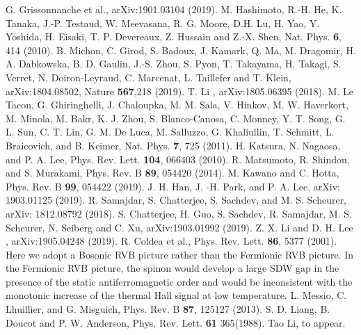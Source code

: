 \documentclass[prb,twocolumn,showpacs]{revtex4}
\begin{document}
\begin{thebibliography}{99}
 G. Grissonnanche et al., arXiv:1901.03104 (2019).
M. Hashimoto, R.-H. He, K. Tanaka, J.-P. Testaud, W. Meevasana, R. G. Moore, D.H. Lu, H. Yao, Y. Yoshida, H. Eisaki, T. P. Devereaux, Z. Hussain and Z.-X. Shen, Nat. Phys. \textbf{6}, 414 (2010).
B. Michon, C. Girod, S. Badoux, J. Kamark, Q. Ma, M. Dragomir, H. A. Dabkowska, B. D. Gaulin, J.-S. Zhou, S. Pyon, T. Takayama, H. Takagi, S. Verret, N.
Doiron-Leyraud, C. Marcenat, L. Taillefer and T. Klein, arXiv:1804.08502, Nature \textbf{567},218 (2019).
T. Li , arXiv:1805.06395 (2018).
M. Le Tacon, G. Ghiringhelli, J. Chaloupka, M. M. Sala, V. Hinkov, M. W. Haverkort, M. Minola, M. Bakr, K. J. Zhou, S. Blanco-Canosa, C. Monney, Y. T. Song, G. L. Sun, C. T. Lin, G. M. De Luca, M. Salluzzo, G. Khaliullin, T. Schmitt, L. Braicovich, and B. Keimer, Nat. Phys. \textbf{7}, 725 (2011).
H. Katsura, N. Nagaosa, and P. A. Lee,  Phys. Rev. Lett. \textbf{104}, 066403 (2010).
R. Matsumoto, R. Shindou, and S. Murakami, Phys. Rev. B \textbf{89}, 054420 (2014).
M. Kawano and C. Hotta, Phys. Rev. B \textbf{99}, 054422 (2019).
 J. H. Han, J. -H. Park, and P. A. Lee, arXiv: 1903.01125 (2019).
R. Samajdar, S. Chatterjee, S. Sachdev, and M. S. Scheurer, arXiv: 1812.08792 (2018).
 S. Chatterjee, H. Guo, S. Sachdev, R. Samajdar, M. S. Scheurer, N. Seiberg and C. Xu, arXiv:1903.01992 (2019).
 Z. X. Li and D. H. Lee , arXiv:1905.04248 (2019).
R. Coldea et al., Phys. Rev. Lett. \textbf{86}, 5377 (2001).
Here we adopt a Bosonic RVB picture rather than the Fermionic RVB picture. In the Fermionic RVB picture, the spinon would develop a large SDW gap in the presence of the static antiferromagnetic order and would be inconsistent with the monotonic increase of the thermal Hall signal at low temperature.
L. Messio, C. Lhuillier, and G. Misguich, Phys. Rev. B \textbf{87}, 125127 (2013).
S. D. Liang, B. Doucot and P. W. Anderson, Phys. Rev. Lett. \textbf{61}  365(1988).
Tao Li, to appear.
\end{thebibliography}
\end{document}
